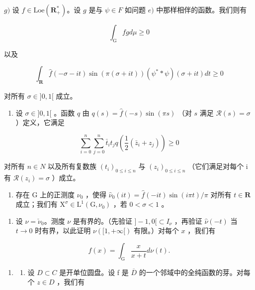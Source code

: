 \(g)\) 设 \(f \in \mathrm{Loe}(\mathbf{R}_{+}^{*})\)。设 \(g\) 是与 \(\psi \in F\) 如问题 \(e)\) 中那样相伴的函数。我们则有

\[
\int_ {\mathrm{G}} f g d \mu \geqslant 0
\]

以及

\[
\int_ {\mathbf {R}} \widehat {f} (- \sigma - i t) \sin (\pi (\sigma + i t)) (\psi^ {*} * \psi) (\sigma + i t) d t \geqslant 0
\]

对所有 \(\sigma\in]0,1[\) 成立。

\begin{enumerate}
\def\labelenumi{\alph{enumi})}
\setcounter{enumi}{7}
\tightlist
\item
  设 \(\sigma \in ]0,1[\) 。函数 \(q\) 由 \(q(s) = \widehat{f}(-s)\sin(\pi s)\) （对 \(s\) 满足 \(\mathcal{R}(s) = \sigma\) ）定义，它满足
\end{enumerate}

\[
\sum_ {i = 0} ^ {n} \sum_ {j = 0} ^ {n} \bar {t} _ {i} t _ {j} q \left(\frac {1}{2} (\bar {z} _ {i} + z _ {j})\right) \geqslant 0
\]

对所有 \(n \in N\) 以及所有复数族 \((t_{i})_{0 \leqslant i \leqslant n}\) 与 \((z_{i})_{0 \leqslant i \leqslant n}\) （它们满足对每个 i 有 \(\mathcal{R}(z_{i}) = \sigma\) ）成立。

\begin{enumerate}
\def\labelenumi{\roman{enumi})}
\tightlist
\item
  存在 G 上的正测度 \(\nu_0\) ，使得 \(\widehat{\nu}_0(it) = \widehat{f}(-it)\sin(i\pi t)/\pi\) 对所有 \(t\in\mathbf{R}\) 成立；我们有 \(\mathrm{X}^{\sigma}\in\mathrm{L}^{1}(\mathrm{G},\nu_{0})\) ，若 \(0<\sigma<1\) 。
\end{enumerate}

\begin{enumerate}
\def\labelenumi{\alph{enumi})}
\setcounter{enumi}{9}
\tightlist
\item
  设 \(\nu = \check{\nu}_0\)。测度 \(\nu\) 是有界的。（先验证 \(]-1,0[ \subset I_{\nu}\) ，再验证 \(\widehat{\nu}(-t)\) 当 \(t \to 0\) 时有界，以此证明 \(\nu([1,+\infty[)\) 有限。）对每个 \(x\) ，我们有
\end{enumerate}

\[
f (x) = \int_ {\mathrm{G}} \frac {x}{x + t} d \nu (t).
\]

\begin{enumerate}
\def\labelenumi{\arabic{enumi})}
\setcounter{enumi}{27}
\tightlist
\item
  \begin{enumerate}
  \def\labelenumii{\alph{enumii})}
  \tightlist
  \item
    设 \(D \subset C\) 是开单位圆盘。设 f 是 \(\overline{D}\) 的一个邻域中的全纯函数的芽。对每个 \(z \in D\) ，我们有
  \end{enumerate}
\end{enumerate}


